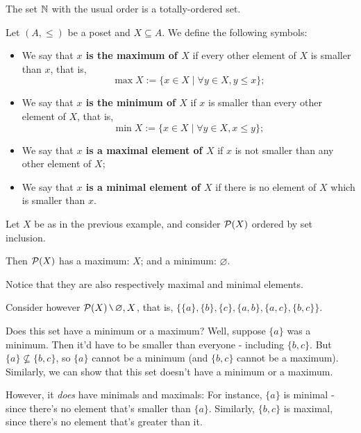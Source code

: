 \begin{lemma}
	The set $\mathbb N$ with the usual order is a totally-ordered set.
\end{lemma}

\begin{df}
	Let $(A,\leq)$ be a poset and $X\subseteq A$. We define the following symbols:
	
	\begin{itemize}
		\item We say that \textbf{$x$ is the maximum of $X$} if every other element of $X$ is smaller than $x$, that is, $$\max X:=\{x\in X\mid \forall y\in X, y\leq x\};$$
		
		\item We say that \textbf{$x$ is the minimum of $X$} if $x$ is smaller than every other element of $X$, that is, $$\min X:=\{x\in X\mid \forall y\in X, x\leq y\};$$
		
		\item We say that \textbf{$x$ is a maximal element of $X$} if $x$ is not smaller than any other element of $X$;
		
		\item We say that \textbf{$x$ is a minimal element of $X$} if there is no element of $X$ which is smaller than $x$. 
	\end{itemize}
\end{df}

\begin{ex}
	Let $X$ be as in the previous example, and consider $\mathcal P(X)$ ordered by set inclusion.
	
	Then $\mathcal P(X)$ has a maximum: $X$; and a minimum: $\varnothing$.
	
	Notice that they are also respectively maximal and minimal elements.
	
	Consider however $\mc P(X)\setminus{\varnothing, X}$, that is, $\{\{a\},\{b\},\{c\},\{a,b\},\{a,c\},\{b,c\}\}$. 
	
	Does this set have a minimum or a maximum? Well, suppose $\{a\}$ was a minimum. Then it'd have to be smaller than everyone - including $\{b,c\}$. But $\{a\}\not\subseteq \{b,c\}$, so $\{a\}$ cannot be a minimum (and $\{b,c\}$ cannot be a maximum). Similarly, we can show that this set doesn't have a minimum or a maximum.
	
	However, it \textit{does} have minimals and maximals: For instance, $\{a\}$ is minimal - since there's no element that's smaller than $\{a\}$. Similarly, $\{b,c\}$ is maximal, since there's no element that's greater than it.
\end{ex}

